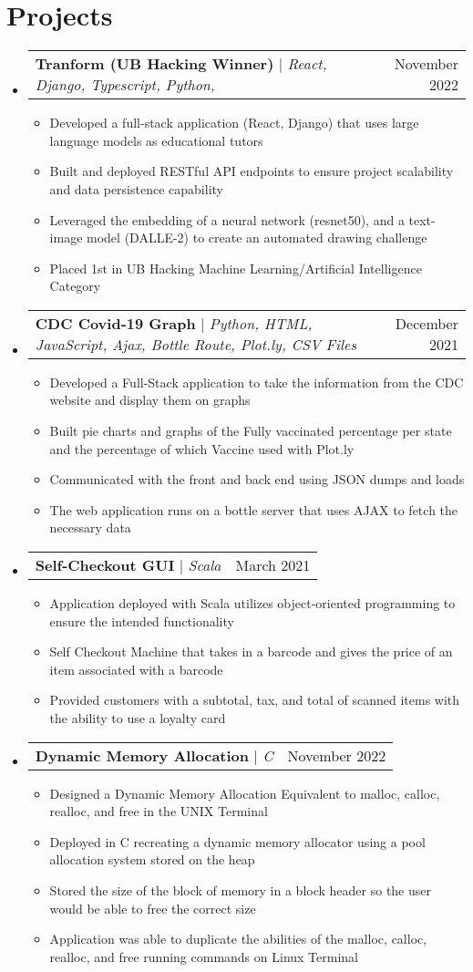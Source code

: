 \documentclass[letterpaper,11pt]{article}
\makeatletter
\newcommand{\resumeItem}[1]{
  \item\small{
    {#1 \vspace{-2pt}}
  }
}
\newcommand{\resumeProjectHeading}[2]{
    \item
    \begin{tabular*}{0.97\textwidth}{l@{\extracolsep{\fill}}r}
      \small#1 & #2 \\
    \end{tabular*}\vspace{-7pt}
}
\newcommand{\resumeSubHeadingListStart}{\begin{itemize}[leftmargin=0.15in, label={}]}
\newcommand{\resumeSubHeadingListEnd}{\end{itemize}}
\newcommand{\resumeItemListStart}{\begin{itemize}}
\newcommand{\resumeItemListEnd}{\end{itemize}\vspace{-5pt}}
\makeatother
\begin{document}
\section{Projects}
    \resumeSubHeadingListStart
      \resumeProjectHeading
          {\textbf{Tranform (UB Hacking Winner)} $|$ \emph{React, Django, Typescript, Python,}}{November  2022}
          \resumeItemListStart
            \resumeItem{Developed a full-stack application (React, Django) that uses large language models as educational tutors}
            \resumeItem{Built and deployed RESTful API endpoints to ensure project scalability and data persistence capability}
            \resumeItem{ Leveraged the embedding of a neural network (resnet50), and a text-image model (DALLE-2) to create an automated drawing challenge}
            \resumeItem{Placed 1st in UB Hacking Machine Learning/Artificial Intelligence Category}
          \resumeItemListEnd
      \resumeProjectHeading
          {\textbf{CDC Covid-19 Graph} $|$ \emph{Python, HTML, JavaScript, Ajax, Bottle Route, Plot.ly, CSV Files}}{December 2021}
          \resumeItemListStart
            \resumeItem{Developed a Full-Stack application to take the information from the CDC website and display them on graphs}
            \resumeItem{Built pie charts and graphs of the Fully vaccinated percentage per state and the percentage of which Vaccine used with Plot.ly}
            \resumeItem{Communicated with the front and back end using JSON dumps and loads}
            \resumeItem{The web application runs on a bottle server that uses AJAX to fetch the necessary data}
          \resumeItemListEnd
    \resumeProjectHeading
          {\textbf{Self-Checkout GUI} $|$ \emph{Scala}}{March 2021}
          \resumeItemListStart
            \resumeItem{Application deployed with Scala utilizes object-oriented programming to ensure the intended functionality}
            \resumeItem{Self Checkout Machine that takes in a barcode and gives the price of an item associated with a barcode}
            \resumeItem{Provided customers with a subtotal, tax, and total of scanned items with the ability to use a loyalty card}
          \resumeItemListEnd
    \resumeProjectHeading
          {\textbf{Dynamic Memory  Allocation} $|$ \emph{C}}{November  2022}
          \resumeItemListStart
            \resumeItem{Designed a Dynamic Memory Allocation Equivalent to malloc, calloc, realloc, and free in the UNIX Terminal}
            \resumeItem{Deployed in C recreating a dynamic memory allocator using a pool allocation system stored on the heap}
            \resumeItem{Stored the size of the block of memory in a block header so the user would be able to free the correct size}
            \resumeItem{Application was able to duplicate the abilities of the malloc, calloc, realloc, and free running commands on Linux Terminal}
          \resumeItemListEnd
    \resumeSubHeadingListEnd
\end{document}
